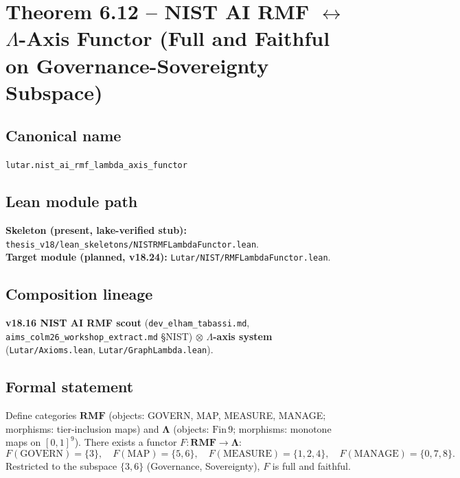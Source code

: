 \section{Theorem 6.12 -- NIST AI RMF $\leftrightarrow$ $\Lambda$-Axis
  Functor (Full and Faithful on Governance-Sovereignty Subspace)}
\label{sec:thm12}

\subsection*{Canonical name}
\verb|lutar.nist_ai_rmf_lambda_axis_functor|

\subsection*{Lean module path}
\textbf{Skeleton (present, lake-verified stub):}
\texttt{thesis\_v18/lean\_skeletons/NISTRMFLambdaFunctor.lean}.\\
\textbf{Target module (planned, v18.24):}
\texttt{Lutar/NIST/RMFLambdaFunctor.lean}.

\subsection*{Composition lineage}
\textbf{v18.16 NIST AI RMF scout}
(\texttt{dev\_elham\_tabassi.md},
\texttt{aims\_colm26\_workshop\_extract.md} \S{}NIST) $\otimes$
\textbf{\(\Lambda\)-axis system}
(\texttt{Lutar/Axioms.lean},
\texttt{Lutar/GraphLambda.lean}).

\subsection*{Formal statement}

\begin{theorem}
\label{thm:nist-rmf-functor}
Define categories $\mathbf{RMF}$ (objects: GOVERN, MAP, MEASURE,
MANAGE; morphisms: tier-inclusion maps) and $\mathbf{\Lambda}$
(objects: $\mathrm{Fin}\,9$; morphisms: monotone maps on $[0,1]^9$).
There exists a functor $F : \mathbf{RMF} \to \mathbf{\Lambda}$:
\[
  F(\mathrm{GOVERN}) = \{3\},\quad
  F(\mathrm{MAP}) = \{5,6\},\quad
  F(\mathrm{MEASURE}) = \{1,2,4\},\quad
  F(\mathrm{MANAGE}) = \{0,7,8\}.
\]
Restricted to the subspace $\{3,6\}$ (Governance, Sovereignty),
$F$ is full and faithful.
\end{theorem}

